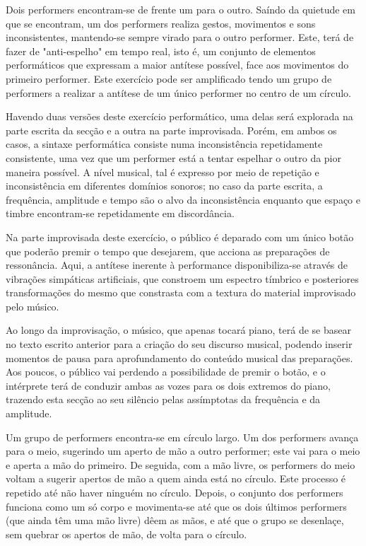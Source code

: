 \documentclass[../main.tex]{subfiles}
\begin{document}
\begin{performex}
    Dois performers encontram-se de frente um para o outro. Saíndo da quietude em que se encontram, um dos performers realiza gestos, movimentos e sons inconsistentes, mantendo-se sempre virado para o outro performer. Este, terá de fazer de "anti-espelho" em tempo real, isto é, um conjunto de elementos performáticos que expressam a maior antítese possível, face aos movimentos do primeiro performer. Este exercício pode ser amplificado tendo um grupo de performers a realizar a antítese de um único performer no centro de um círculo.
\end{performex}

Havendo duas versões deste exercício performático, uma delas será explorada na parte escrita da secção e a outra na parte improvisada. Porém, em ambos os casos, a sintaxe performática consiste numa inconsistência repetidamente consistente, uma vez que um performer está a tentar espelhar o outro da pior maneira possível. A nível musical, tal é expresso por meio de repetição e inconsistência em diferentes domínios sonoros; no caso da parte escrita, a frequência, amplitude e tempo são o alvo da inconsistência enquanto que espaço e timbre encontram-se repetidamente em discordância.

Na parte improvisada deste exercício, o público é deparado com um único botão que poderão premir o tempo que desejarem, que acciona as preparações de ressonância. Aqui, a antítese inerente à performance disponibiliza-se através de vibrações simpáticas artificiais, que constroem um espectro tímbrico e posteriores transformações do mesmo que constrasta com a textura do material improvisado pelo músico.

Ao longo da improvisação, o músico, que apenas tocará piano, terá de se basear no texto escrito anterior para a criação do seu discurso musical, podendo inserir momentos de pausa para aprofundamento do conteúdo musical das preparações. Aos poucos, o público vai perdendo a possibilidade de premir o botão, e o intérprete terá de conduzir ambas as vozes para os dois extremos do piano, trazendo esta secção ao seu silêncio pelas assímptotas da frequência e da amplitude.

\begin{performex}
    Um grupo de performers encontra-se em círculo largo. Um dos performers avança para o meio, sugerindo um aperto de mão a outro performer; este vai para o meio e aperta a mão do primeiro. De seguida, com a mão livre, os performers do meio voltam a sugerir apertos de mão a quem ainda está no círculo. Este processo é repetido até não haver ninguém no círculo. Depois, o conjunto dos performers funciona como um só corpo e movimenta-se até que os dois últimos performers (que ainda têm uma mão livre) dêem as mãos, e até que o grupo se desenlaçe, sem quebrar os apertos de mão, de volta para o círculo.
\end{performex}
\end{document}
